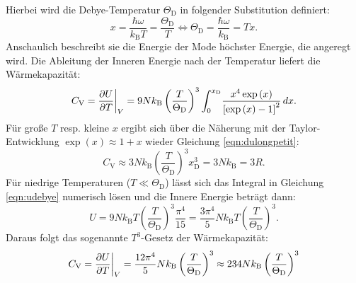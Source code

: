 Hierbei wird die Debye-Temperatur $\Theta_{\text{D}}$ in folgender Substitution definiert:
\begin{equation*}
	x = \frac{\hbar \omega}{k_{\text{B}} T} = \frac{\Theta_{\text{D}}}{T} \Leftrightarrow  \Theta_{\text{D}} = \frac{\hbar \omega}{k_{\text{B}}} = T x.
\end{equation*}
Anschaulich beschreibt sie die Energie der Mode höchster Energie, die angeregt wird.
Die Ableitung der Inneren Energie nach der Temperatur liefert die Wärmekapazität:
\begin{equation*}
	C_{\text{V}} = \frac{\partial U}{\partial T} \bigg{\vert}_{V} = 9 N k_{\text{B}} \left( \frac{T}{\Theta_{\text{D}}} \right)^3 \int_{0}^{x_{\text{D}}} \! \frac{ x^4 \exp{(x)}}{ \left[ \exp{ (x) } - 1  \right]^2}  \, dx.
\end{equation*}
Für große $T$ resp. kleine $x$ ergibt sich über die Näherung mit der Taylor-Entwicklung $\exp(x) \approx 1 + x $ wieder Gleichung \eqref{eqn:dulongpetit}:
\begin{equation*}
	C_{\text{V}} \approx 3 N k_{\text{B}} \left( \frac{T}{\Theta_{\text{D}}} \right)^3 x_{\text{D}}^3= 3 N k_{\text{B}} = 3 R.
\end{equation*}
Für niedrige Temperaturen ($T \ll \Theta_{\text{D}}$) lässt sich das Integral in Gleichung \eqref{eqn:udebye} numerisch lösen und die Innere Energie beträgt dann:
\begin{equation*}
	U = 9 N k_{\text{B}} T \left( \frac{T}{\Theta_{\text{D}}} \right)^3 \frac{\pi^4}{15} = \frac{3 \pi^4}{5} N k_{\text{B}} T \left( \frac{T}{\Theta_{\text{D}}} \right)^3.
\end{equation*}
Daraus folgt das sogenannte $T^3$-Gesetz der Wärmekapazität:
\begin{equation*}
	C_{\text{V}} = \frac{\partial U}{\partial T} \bigg{\vert}_{V} = \frac{12 \pi^4}{5} N k_{\text{B}} \left( \frac{T}{\Theta_{\text{D}}} \right)^3 \approx 234 N k_{\text{B}} \left( \frac{T}{\Theta_{\text{D}}} \right)^3
\end{equation*}

\FloatBarrier
